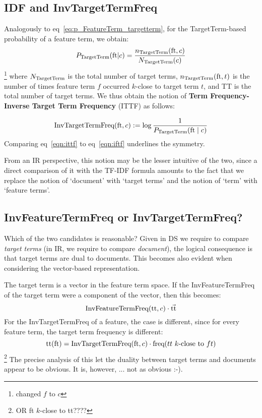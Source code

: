 \subsection{IDF and InvTargetTermFreq}
Analogously to eq~\ref{eq:p_FeatureTerm_targetterm}, for
the TargetTerm-based probability of a feature term, we obtain:
\begin{equation}
P_{\textmd{TargetTerm}}(\textmd{ft}|c) =
\frac{n_{\textmd{TargetTerm}}(\textmd{ft}, c)}{N_{\textmd{TargetTerm}}(c)}
\end{equation}
\footnote{changed $f$ to $c$}
where  $N_{\textmd{TargetTerm}}$ is the total number of target terms,    $n_{\textmd{TargetTerm}}(\textmd{ft}, t)$
is the number of  times feature term $f$ occurred   $k$-close to target term  $t$,  and TT is the total number of target terms.
%
We thus obtain the notion of  {\bf Term Frequency-Inverse Target Term Frequency} (ITTF) as follows:

\begin{equation}
\label{eqn:ittf}
\textmd{InvTargetTermFreq}(\textmd{ft}, c) :=
\log{\frac{1}{P_{\textmd{TargetTerm}}(\textmd{ft}\mid c)}}
\end{equation}
Comparing eq~\ref{eqn:ittf} to eq~\ref{eqn:iftf} underlines the symmetry.

From an IR perspective, this notion may be  the  lesser intuitive of the two, since a direct comparison of it  with the TF-IDF formula amounts to the fact that  we replace the notion of `document' with `target terms' and the notion of `term' with `feature terms'.

\subsection{InvFeatureTermFreq or InvTargetTermFreq?}

Which of the two candidates is reasonable?
%
Given in DS we require to compare \emph{target terms}
(in IR, we require to compare \emph{document}), the logical consequence is
that target terms are dual to documents.
%
This becomes also evident when considering the vector-based representation.

The target term is a vector in the feature term space.
If the InvFeatureTermFreq of the target term were a component of the vector,
then this becomes:
\[
\textmd{InvFeatureTermFreq}(\textmd{tt},c) \cdot \vec{\textmd{tt}}
\]
For the InvTargetTermFreq of a feature, the case is different, since for
every feature term, the target term frequency is different:
\[
\textmd{tt}(\textmd{ft}) = \textmd{InvTargetTermFreq}(\textmd{ft},c) \cdot
	\textmd{freq($tt$ $k$-close to $ft$)}
\]
\footnote{OR ft $k$-close to tt????}
The precise analysis of this let the duality between target terms and documents
appear to be obvious.
%
It is, however, ... not as obvious :-).

